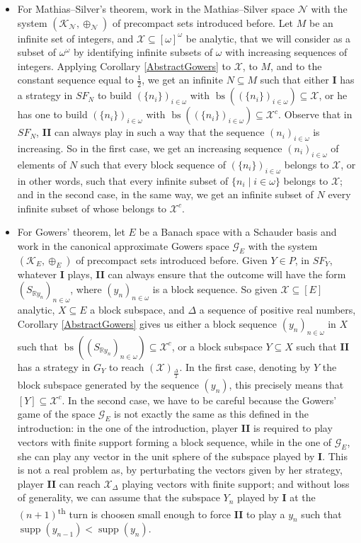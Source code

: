 \documentclass[a4paper,11pt]{article}
\theoremstyle{definition}
\numberwithin{equation}{section}
\newcommand{\R}{\mathbb{R}}
\newcommand{\X}{\mathcal{X}}
\newcommand{\elinf}{[\omega]^\omega}
\newcommand{\Sil}{\mathcal{N}}
\newcommand{\G}{\mathcal{G}}
\newcommand{\I}{\textbf{I}}
\newcommand{\II}{\textbf{II}}
\newcommand{\K}{\mathcal{K}}
\DeclareMathOperator{\supp}{supp}
\DeclareMathOperator{\bs}{bs}
\begin{document}
\begin{itemize}

\item For Mathias--Silver's theorem, work in the Mathias--Silver space $\Sil$ with the system $(\K_\Sil, \oplus_\Sil)$ of precompact sets introduced before. Let $M$ be an infinite set of integers, and $\X \subseteq \elinf$ be analytic, that we will consider as a subset of $\omega^\omega$ by identifying infinite subsets of $\omega$ with increasing sequences of integers. Applying Corollary \ref{AbstractGowers} to $\X$, to $M$, and to the constant sequence equal to $\frac{1}{2}$, we get an infinite $N \subseteq M$ such that either \I{} has a strategy in $SF_N$ to build $(\{n_i\})_{i \in \omega}$ with $\bs((\{n_i\})_{i \in \omega}) \subseteq \X$, or he has one to build $(\{n_i\})_{i \in \omega}$ with $\bs((\{n_i\})_{i \in \omega}) \subseteq \X^c$. Observe that in $SF_N$, \II{} can always play in such a way that the sequence $(n_i)_{i \in \omega}$ is increasing. So in the first case, we get an increasing sequence $(n_i)_{i \in \omega}$ of elements of $N$ such that every block sequence of $(\{n_i\})_{i \in \omega}$ belongs to $\X$, or in other words, such that every infinite subset of $\{n_i \mid i \in \omega\}$ belongs to $\X$; and in the second case, in the same way, we get an infinite subset of $N$ every infinite subset of whose belongs to $\X^c$. 

\item For Gowers' theorem, let $E$ be a Banach space with a Schauder basis and work in the canonical approximate Gowers space $\G_E$ with the system $(\K_E, \oplus_E)$ of precompact sets introduced before. Given $Y \in P$, in $SF_Y$, whatever \I{} plays, \II{} can always ensure that the outcome will have the form $(S_{\R y_n})_{n \in \omega}$, where $(y_n)_{n \in \omega}$ is a block sequence. So given $\X \subseteq [E]$ analytic, $X \subseteq E$ a block subspace, and $\Delta$ a sequence of positive real numbers, Corollary \ref{AbstractGowers} gives us either a block sequence $(y_n)_{n \in \omega}$ in $X$ such that $\bs((S_{\R y_n})_{n \in \omega}) \subseteq \X^c$, or a block subspace $Y \subseteq X$ such that \II{} has a strategy in $G_Y$ to reach $(\X)_{\frac\Delta 2}$. In the first case, denoting by $Y$ the block subspace generated by the sequence $(y_n)$, this precisely means that $[Y] \subseteq \X^c$. In the second case, we have to be careful because the Gowers' game of the space $\G_E$ is not exactly the same as this defined in the introduction: in the one of the introduction, player \II{} is required to play vectors with finite support forming a block sequence, while in the one of $\G_E$, she can play any vector in the unit sphere of the subspace played by \I{}. This is not a real problem as, by perturbating the vectors given by her strategy, player \II{} can reach $\X_\Delta$ playing vectors with finite support; and without loss of generality, we can assume that the subspace $Y_n$ played by \I{} at the $(n+1)$\textsuperscript{th} turn is choosen small enough to force \II{} to play a $y_n$ such that $\supp(y_{n - 1}) < \supp(y_n)$.


\end{itemize}
\end{document}
